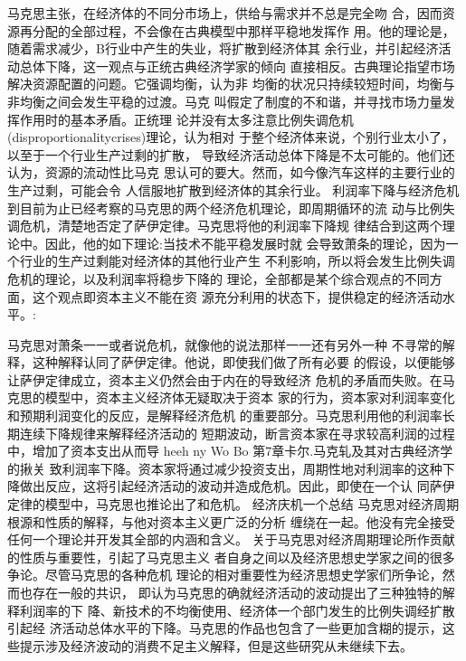 马克思主张，在经济体的不同分市场上，供给与需求并不总是完全吻
合，因而资源再分配的全部过程，不会像在古典模型中那样平稳地发挥作
用。他的理论是，随着需求减少，B行业中产生的失业，将扩散到经济体其
余行业，并引起经济活动总体下降，这一观点与正统古典经济学家的倾向
直接相反。古典理论指望市场解决资源配置的问题。它强调均衡，认为非
均衡的状况只持续较短时间，均衡与非均衡之间会发生平稳的过渡。马克
叫假定了制度的不和谐，并寻找市场力量发挥作用时的基本矛盾。正统理
论并没有太多注意比例失调危机(disproportionalitycrises)理论，认为相对
于整个经济体来说，个别行业太小了，以至于一个行业生产过剩的扩散，
导致经济活动总体下降是不太可能的。他们还认为，资源的流动性比马克
思认可的要大。然而，如今像汽车这样的主要行业的生产过剩，可能会令
人信服地扩散到经济体的其余行业。
利润率下降与经济危机
到目前为止已经考察的马克思的两个经济危机理论，即周期循环的流
动与比例失调危机，清楚地否定了萨伊定律。马克思将他的利润率下降规
律结合到这两个理论中。因此，他的如下理论:当技术不能平稳发展时就
会导致萧条的理论，因为一个行业的生产过剩能对经济体的其他行业产生
不利影响，所以将会发生比例失调危机的理论，以及利润率将稳步下降的
理论，全部都是某个综合观点的不同方面，这个观点即资本主义不能在资
源充分利用的状态下，提供稳定的经济活动水平。:

马克思对萧条一一或者说危机，就像他的说法那样一一还有另外一种
不寻常的解释，这种解释认同了萨伊定律。他说，即使我们做了所有必要
的假设，以便能够让萨伊定律成立，资本主义仍然会由于内在的导致经济
危机的矛盾而失败。在马克思的模型中，资本主义经济体无疑取决于资本
家的行为，资本家对利润率变化和预期利润变化的反应，是解释经济危机
的重要部分。马克思利用他的利润率长期连续下降规律来解释经济活动的
短期波动，断言资本家在寻求较高利润的过程中，增加了资本支出从而导
heeh
ny
Wo
Bo
第7章卡尔.马克轧及其对古典经济学的揪关
致利润率下降。资本家将通过减少投资支出，周期性地对利润率的这种下
降做出反应，这将引起经济活动的波动并造成危机。因此，即使在一个认
同萨伊定律的模型中，马克思也推论出了和危机。
经济庆机一个总结
马克思对经济周期根源和性质的解释，与他对资本主义更广泛的分析
缠绕在一起。他没有完全接受任何一个理论并开发其全部的内涵和含义。
关于马克思对经济周期理论所作贡献的性质与重要性，引起了马克思主义
者自身之间以及经济思想史学家之间的很多争论。尽管马克思的各种危机
理论的相对重要性为经济思想史学家们所争论，然而也存在一般的共识，
即认为马克思的确就经济活动的波动提出了三种独特的解释利润率的下
降、新技术的不均衡使用、经济体一个部门发生的比例失调经扩散引起经
济活动总体水平的下降。马克思的作品也包含了一些更加含糊的提示，这
些提示涉及经济波动的消费不足主义解释，但是这些研究从未继续下去。

